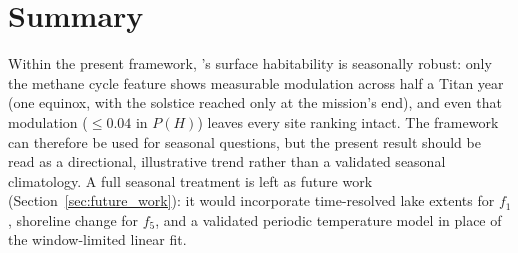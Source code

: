 \section{Summary}
\label{sec:seasonal_summary}

Within the present framework, \titan{}'s surface habitability is seasonally
robust: only the methane cycle feature shows measurable modulation across half
a Titan year (one equinox, with the solstice reached only at the mission's
end), and even that modulation ($\leq 0.04$ in $P(H)$) leaves every site
ranking intact.  The framework can therefore be used for seasonal questions,
but the present result should be read as a directional, illustrative trend
rather than a validated seasonal climatology.  A full seasonal treatment is
left as future work (Section~\ref{sec:future_work}): it would incorporate
time-resolved lake extents for $f_1$, shoreline change for $f_5$, and a
validated periodic temperature model in place of the window-limited
\citet{Jennings2019} linear fit.
